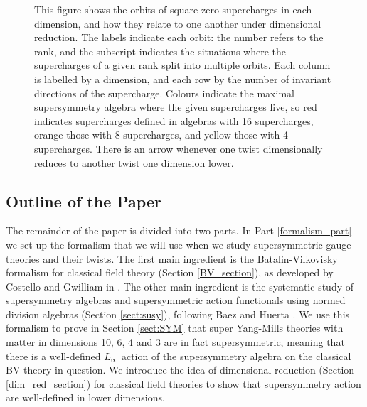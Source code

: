 \documentclass[10pt, oneside]{article}
\begin{document}
\begin{figure}[hbp]
\caption{This figure shows the orbits of square-zero supercharges in each dimension, and how they relate to one another under dimensional reduction.  The labels indicate each orbit: the number refers to the rank, and the subscript indicates the situations where the supercharges of a given rank split into multiple orbits.  Each column is labelled by a dimension, and each row by the number of invariant directions of the supercharge.  Colours indicate the maximal supersymmetry algebra where the given supercharges live, so red indicates supercharges defined in algebras with 16 supercharges, orange those with 8 supercharges, and yellow those with 4 supercharges.  There is an arrow whenever one twist dimensionally reduces to another twist one dimension lower.}
\label{fig:superchargeorbits}
\end{figure}

\subsection*{Outline of the Paper}
The remainder of the paper is divided into two parts.  In Part \ref{formalism_part} we set up the formalism that we will use when we study supersymmetric gauge theories and their twists.  The first main ingredient is the Batalin-Vilkovisky formalism \cite{BatalinVilkovisky} for classical field theory (Section \ref{BV_section}), as developed by Costello and Gwilliam in \cite{CostelloBook, Book1, Book2}.  The other main ingredient is the systematic study of supersymmetry algebras and supersymmetric action functionals using normed division algebras (Section \ref{sect:susy}), following Baez and Huerta \cite{BaezHuerta}.  We use this formalism to prove in Section \ref{sect:SYM} that super Yang-Mills theories with matter in dimensions 10, 6, 4 and 3 are in fact supersymmetric, meaning that there is a well-defined $L_\infty$ action of the supersymmetry algebra on the classical BV theory in question.  We introduce the idea of dimensional reduction (Section \ref{dim_red_section}) for classical field theories to show that supersymmetry action are well-defined in lower dimensions.
\end{document}
